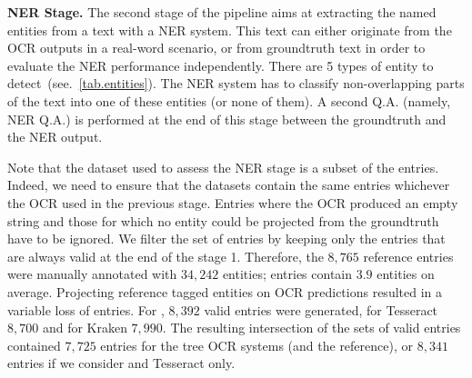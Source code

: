 \textbf{NER Stage.} The second stage of the pipeline aims at extracting the named entities from a text with a NER
system. This text can either originate from the OCR outputs in a real-word scenario, or from groundtruth text in order to
evaluate the NER performance independently. There are 5 types of entity to detect~(see.~\cref{tab.entities}).
The NER system has to classify non-overlapping parts of the text into one of these entities (or none of them). A second
Q.A. (namely, NER Q.A.) is performed at the end of this stage between the groundtruth and the NER output.

Note that the dataset used to assess the NER stage is a subset of the entries. Indeed, we need to ensure that the datasets
contain the same entries whichever the OCR used in the previous stage. Entries where the OCR produced an empty string
and those for which no entity could be projected from the groundtruth have to be ignored. 
We filter the set of entries by keeping only the entries that are always valid at the end of the stage 1.
Therefore, the $8,765$ reference entries were manually annotated with $34,242$ entities; entries contain $3.9$ entities on average.
Projecting reference tagged entities on OCR predictions resulted in a variable loss of entries.
For \peroocr, $8,392$ valid entries were generated, for Tesseract $8,700$ and for Kraken $7,990$.
The resulting intersection of the sets of valid entries contained $7,725$ entries for the tree OCR systems (and the reference),
or $8,341$ entries if we consider \peroocr and Tesseract only.

